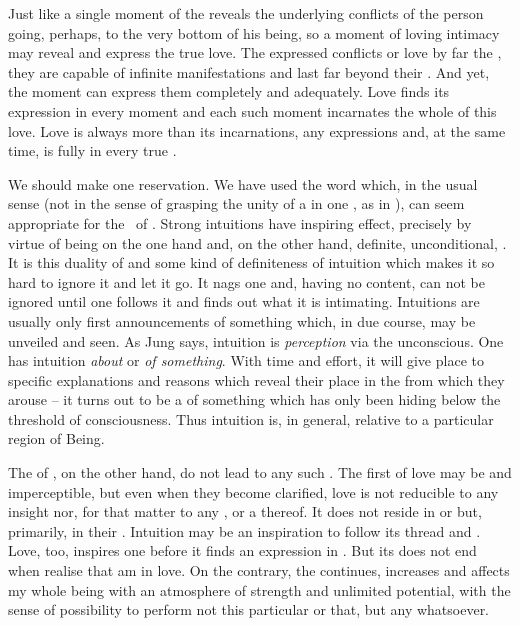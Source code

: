 Just like a single moment of the  reveals the underlying
conflicts of the person going, perhaps, to the very bottom of his being, so a
moment of loving intimacy may reveal and express the true love.  The expressed
conflicts or love  by far the \hoa, they are capable of infinite
manifestations and last far beyond their . And yet, the moment can
express them completely and adequately. Love finds its expression in every
moment and each such moment {incarnates} the whole  of this love.
Love is always more than its {incarnations},  any 
expressions and, at the same time, is fully  in every true
.

\pa\label{pa:inspInt} We should make one reservation. We have used the word
 which, in the usual sense (not in the sense of grasping the unity
of a  in one , as in ), can seem appropriate
for the \oss\ of .  Strong intuitions have inspiring effect,
precisely by virtue of being on the one hand  and, on the other hand,
definite, unconditional, .  It is this duality of  and
some kind of definiteness of intuition which makes it so hard to ignore it and
let it go. It nags one and, having no  content, can not
be ignored until one follows it and finds out what it is intimating.  Intuitions
are usually only first announcements of something which, in due course, may be
unveiled and seen.  As Jung says, intuition is {\em perception} via the
unconscious. One has intuition {\em about} or {\em of something}.  With time and
effort, it will give place to specific explanations and  reasons
which reveal their place in the  from which they arouse -- it turns
out to be a  of something  which has only been hiding below
the threshold of consciousness.  Thus intuition is, in general, relative to a
particular region of Being.

The  of , on the other hand, do not lead to any such
. The first  of love may be  and
 imperceptible, but even when they become clarified, love is not
reducible to any  insight nor, for that matter to any ,
 or a  thereof.  It does not reside in  or
 but, primarily, in their .  Intuition may be an
inspiration to follow its thread and .  Love, too, inspires one
before it finds an expression in . But its  does not
end when  realise that  am in love. On the contrary, the
 continues, increases and affects my whole being with an
atmosphere of strength and unlimited potential, with the sense of possibility to
perform not this particular  or that, but any  whatsoever.

